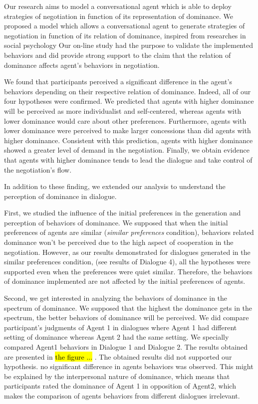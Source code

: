 \documentclass{llncs}
\begin{document}
	Our research aims to model a conversational agent which is able to deploy strategies of negotiation in function of its representation of dominance. 
	We proposed a model which allows a conversational agent to generate strategies of negotiation in function of its relation of dominance, inspired from researches in social psychology
	Our on-line study had the purpose to validate the implemented behaviors and did provide strong support to the claim that the relation of dominance affects agent's behaviors in negotiation.
	
	We found that participants perceived a significant difference in the agent's behaviors depending on their respective relation of dominance.  
	Indeed, all of our four hypotheses were confirmed. We predicted that agents with higher dominance will be perceived as more individualist and self-centered, whereas agents with lower dominance would care about other preferences. Furthermore, agents with lower dominance were perceived to make larger concessions than did agents with higher dominance. Consistent with this prediction, agents with higher dominance showed a greater level of demand in the negotiation. Finally, we obtain evidence that agents with higher dominance tends to lead the dialogue and take control of the negotiation's flow. 
	
	In addition to these finding, we extended our analysis to understand the perception of dominance in dialogue.
	
	First, we studied the influence of the initial preferences in the generation and perception of behaviors of dominance.
	We supposed that when the initial preferences of agents are similar (\textit{similar preferences} condition), behaviors related dominance won't be perceived due to the high aspect of cooperation in the negotiation. However, as our results demonstrated for dialogues generated in the similar preferences condition, (see results of Dialogue 4), all the hypotheses were supported even when the preferences were quiet similar. Therefore, the behaviors of dominance implemented are not affected by the initial preferences of agents.
	
	Second, we get interested in analyzing the behaviors of dominance in the spectrum of dominance. We supposed that the highest the dominance gets in the spectrum, the better behaviors of dominance will be perceived. We did compare participant's judgments of Agent 1 in dialogues where Agent 1 had different setting of dominance whereas Agent 2 had the same setting. We specially compared Agent1 behaviors in Dialogue 1 and Dialogue 2. The results obtained are presented in \hl{the figure ... }.	
	The obtained results did not supported our hypothesis. no significant difference in agents behaviors was observed. This might be explained by the interpersonal nature of dominance, which means that participants rated the dominance of Agent 1 in opposition of Agent2, which makes the comparison of agents behaviors from different dialogues irrelevant. 
	
\end{document}
